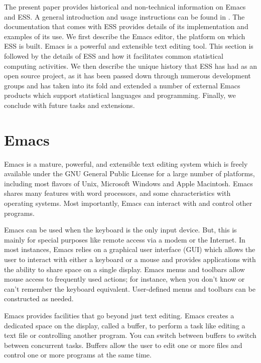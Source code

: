 \documentclass{article}
\begin{document}
The present paper provides historical and non-technical information on
Emacs and ESS.  A general introduction and usage instructions can be
found in \cite{heiberger:dsc:2001}.  The documentation that comes with
ESS provides details of its implementation and examples of its use.
We first describe the Emacs editor, the platform on which ESS is
built.  Emacs is a powerful and extensible text editing tool.  This
section is followed by the details of ESS and how it facilitates
common statistical computing activities.  We then describe the unique
history that ESS has had as an open source project, as it has been
passed down through numerous development groups and has taken into its
fold and extended a number of external Emacs products which support
statistical languages and programming.  Finally, we conclude with
future tasks and extensions.

\section{Emacs}
\label{sec:emacs}

Emacs \citep{RMS:2000} is a mature, powerful, and extensible text
editing system which is freely available under the GNU General Public
License for a large number of platforms, including most flavors of
Unix, Microsoft Windows and Apple Macintosh.  Emacs shares many
features with word processors, and some characteristics with operating
systems.  Most importantly, Emacs can interact with and control other
programs.

Emacs can be used when the keyboard is the only input device.  But,
this is mainly for special purposes like remote access via a modem or
the Internet.  In most instances, Emacs relies on a graphical user
interface (GUI) which allows the user to interact with either a
keyboard or a mouse and provides applications with the ability to
share space on a single display.  Emacs menus and toolbars allow mouse
access to frequently used actions; for instance, when you don't know
or can't remember the keyboard equivalent.  User-defined menus and
toolbars can be constructed as needed.

Emacs provides facilities that go beyond just text editing.  Emacs
creates a dedicated space on the display, called a buffer, to perform
a task like editing a text file or controlling another program.  You
can switch between buffers to switch between concurrent tasks.
Buffers allow the user to edit one or more files and control one or
more programs at the same time.
\end{document}
